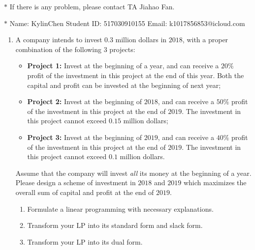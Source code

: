 \documentclass[12pt,a4paper]{article}
\theoremstyle{definition}
\begin{document}
\noindent

\noindent{}
\begin{center}
\footnotesize{\color{red}$*$ If there is any problem, please contact TA Jiahao Fan.}

\footnotesize{\color{blue}$*$ Name: KylinChen  \quad Student ID: 517030910155 \quad Email: k1017856853@icloud.com}
\end{center}

\begin{enumerate}
    \item
    A company intends to invest $0.3$ million dollars in $2018$, with a proper combination of the following $3$ projects:
    \begin{itemize}
    \item \textbf{Project 1:} Invest at the beginning of a year, and can receive a $20\%$ profit of the investment in this project at the end of this year. Both the capital and profit can be invested at the beginning of next year;
    \item \textbf{Project 2:} Invest at the beginning of $2018$, and can receive a $50\%$ profit of the investment in this project at the end of $2019$. The investment in this project cannot exceed $0.15$ million dollars;
    \item \textbf{Project 3:} Invest at the beginning of $2019$, and can receive a $40\%$ profit of the investment in this project at the end of $2019$. The investment in this project cannot exceed $0.1$ million dollars.
    \end{itemize}
    Assume that the company will invest \emph{all} its money at the beginning of a year. Please design a scheme of investment in $2018$ and $2019$ which maximizes the overall sum of capital and profit at the end of $2019$.
    \begin{enumerate}
    \item
    Formulate a linear programming with necessary explanations.

    \item
    Transform your LP into its standard form and slack form.

    \item
    Transform your LP into its dual form.


\end{enumerate}
\end{enumerate}
\end{document}

